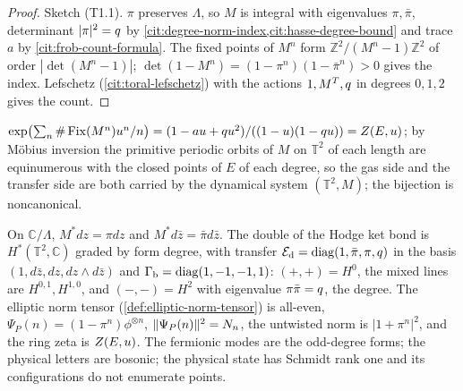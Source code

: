 \begin{proof}
Sketch (T1.1). $\pi$ preserves $\Lambda$, so $M$ is integral with eigenvalues $\pi,\bar\pi$, %
determinant $|\pi|^2 = q$ by \cref{cit:degree-norm-index,cit:hasse-degree-bound} and trace $a$
by \cref{cit:frob-count-formula}. The fixed points of $M^n$ form $\mathbb Z^2/(M^n-1)\mathbb Z^2$ of
order $|\det(M^n-1)|$; $\det(1-M^n) = (1-\pi^n)(1-\bar\pi^n)>0$ gives the index. Lefschetz
(\cref{cit:toral-lefschetz}) with the actions $1,M^T,q$ in degrees $0,1,2$ gives the count.
\end{proof}

\begin{proposition}
\label{prop:toral-zeta}
$\exp\bigl(\sum_n\#\operatorname{Fix}(M^n)u^n/n\bigr) = (1-au+qu^2)/((1-u)(1-qu))
= Z(E,u)$; by M\"obius inversion the primitive periodic orbits of $M$ on $\mathbb T^2$ of each
length are equinumerous with the closed points of $E$ of each degree, so the gas side and the
transfer side are both carried by the dynamical system $(\mathbb T^2,M)$; the bijection is
noncanonical.
\end{proposition}

\begin{theorem}
\label{thm:hodge-doubling-tensor}
On $\mathbb C/\Lambda$, $M^*dz = \pi dz$ and $M^*d\bar z = \bar\pi d\bar z$. The double of the %
Hodge ket bond is $H^*(\mathbb T^2,\mathbb C)$ graded by form degree, with transfer
$\mathcal E_{\mathrm d} = \operatorname{diag}(1,\bar\pi,\pi,q)$ in the basis $(1,d\bar z,dz,dz\wedge d\bar z)$ and
$\Gamma_{\mathrm b} = \operatorname{diag}(1,-1,-1,1)$: $(+,+) = H^0$, the mixed lines are $H^{0,1},H^{1,0}$, and
$(-,-) = H^2$ with eigenvalue $\pi\bar\pi = q$, the degree. The elliptic norm tensor
(\cref{def:elliptic-norm-tensor}) is all-even, $\Psi_P(n) = (1-\pi^n)\phi^{\otimes n}$,
$\|\Psi_P(n)\|^2 = N_{n}$, the untwisted norm is $|1+\pi^n|^2$, and the ring zeta is
$Z(E,u)$. The fermionic modes are the odd-degree forms; the physical letters are bosonic;
the physical state has Schmidt rank one and its configurations do not enumerate points.
\end{theorem}

